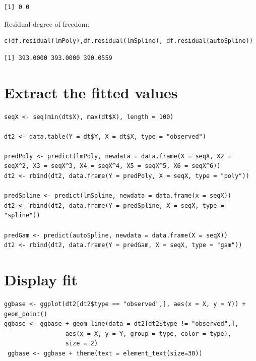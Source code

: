 \documentclass{article}
\begin{document}
\begin{verbatim}
[1] 0 0
\end{verbatim}

Residual degree of freedom:
\begin{lstlisting}
c(df.residual(lmPoly),df.residual(lmSpline), df.residual(autoSpline))
\end{lstlisting}

\begin{verbatim}
[1] 393.0000 393.0000 390.0559
\end{verbatim}

\section{Extract the fitted values}
\label{sec:org46df0fb}
\begin{lstlisting}
seqX <- seq(min(dt$X), max(dt$X), length = 100)

dt2 <- data.table(Y = dt$Y, X = dt$X, type = "observed")

predPoly <- predict(lmPoly, newdata = data.frame(X = seqX, X2 = seqX^2, X3 = seqX^3, X4 = seqX^4, X5 = seqX^5, X6 = seqX^6))
dt2 <- rbind(dt2, data.frame(Y = predPoly, X = seqX, type = "poly"))

predSpline <- predict(lmSpline, newdata = data.frame(x = seqX))
dt2 <- rbind(dt2, data.frame(Y = predSpline, X = seqX, type = "spline"))

predGam <- predict(autoSpline, newdata = data.frame(X = seqX))
dt2 <- rbind(dt2, data.frame(Y = predGam, X = seqX, type = "gam"))
\end{lstlisting}

\section{Display fit}
\label{sec:orga713274}

\begin{lstlisting}
ggbase <- ggplot(dt2[dt2$type == "observed",], aes(x = X, y = Y)) + geom_point()
ggbase <- ggbase + geom_line(data = dt2[dt2$type != "observed",],
			     aes(x = X, y = Y, group = type, color = type),
			     size = 2)
 ggbase <- ggbase + theme(text = element_text(size=30))
\end{lstlisting}
\end{document}
